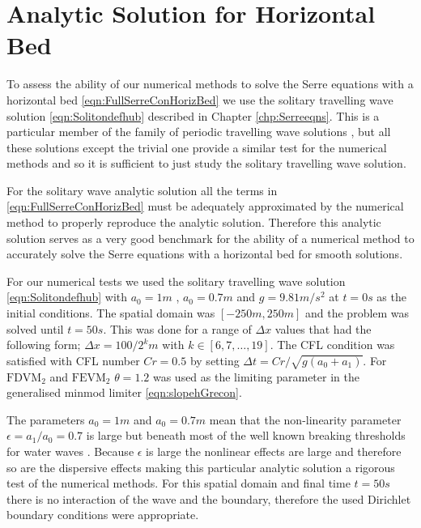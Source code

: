 \section{Analytic Solution for Horizontal Bed}
To assess the ability of our numerical methods to solve the Serre equations with a horizontal bed \eqref{eqn:FullSerreConHorizBed} we use the solitary travelling wave solution \eqref{eqn:Solitondefhub} described in Chapter \ref{chp:Serreeqns}. This is a particular member of the family of periodic travelling wave solutions \cite{El-etal-2006}, but all these solutions except the trivial one provide a similar test for the numerical methods and so it is sufficient to just study the solitary travelling wave solution.

For the solitary wave analytic solution all the terms in \eqref{eqn:FullSerreConHorizBed} must be adequately approximated by the numerical method to properly reproduce the analytic solution. Therefore this analytic solution serves as a very good benchmark for the ability of a numerical method to accurately solve the Serre equations with a horizontal bed for smooth solutions.

For our numerical tests we used the solitary travelling wave solution \eqref{eqn:Solitondefhub} with $a_0 = 1m$ , $a_0 = 0.7m$ and $g= 9.81m/s^2$ at $t=0s$ as the initial conditions. The spatial domain was $[-250m,250m]$ and the problem was solved until $t= 50s$. This was done for a range of $\Delta x$ values that had the following form; $\Delta x = 100 / 2^k m$ with $k \in  \left[6,7, \dots,19\right]$. The CFL condition was satisfied with CFL number $Cr = 0.5$ by setting  $\Delta t = Cr / \sqrt{g\left(a_0 + a_1\right)}$. For $\text{FDVM}_2$ and $\text{FEVM}_2$ $\theta  = 1.2$ was used as the limiting parameter in the generalised minmod limiter \eqref{eqn:slopehGrecon}. 

The parameters $a_0 = 1m$ and $a_0 = 0.7m$  mean that the non-linearity parameter $\epsilon = a_1 / a_0 = 0.7$ is large but beneath most of the well known breaking thresholds for water waves \cite{Ippen-Kulin-1954-4}. Because $\epsilon$ is large the nonlinear effects are large and therefore so are the dispersive effects making this particular analytic solution a rigorous test of the numerical methods. For this spatial domain and final time $t=50s$ there is no interaction of the wave and the boundary, therefore the used Dirichlet boundary conditions were appropriate.

